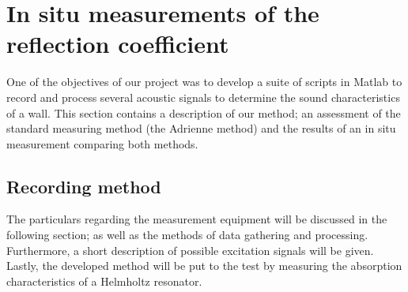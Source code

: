 \begin{comment}
\documentclass[12pt,a4paper]{article}
\usepackage{a4wide}
\usepackage{amsfonts, amsmath, amsthm}
\usepackage[english]{babel}
\usepackage{framed}
\usepackage[pdftex]{graphicx}
\usepackage{epstopdf}
\usepackage[font=small,format=plain,labelfont=bf,up,textfont=it,up]{caption}
\usepackage{wrapfig}
\usepackage{tocloft}
\usepackage{psfrag}
\usepackage{subfig}
\usepackage[latin1]{inputenc}
\usepackage{verbatim}

\usepackage{bbm}
\topmargin -15mm
\textwidth 16truecm
\textheight 24truecm
\setlength\parindent{0pt}
\setlength\parskip{0.20in plus0.05in minus0.05in}
\newcommand{\Z}{\mathbb{Z}}
\newcommand{\N}{\mathbb{N}}
\newcommand{\R}{\mathbb{R}}
\newcommand{\C}{\mathbb{C}}
\newcommand{\eps}{\varepsilon}
\fboxrule 1pt
\fboxsep 7pt
\pagenumbering{arabic}







\end{comment}


\section{In situ measurements of the reflection coefficient}
One of the objectives of our project was to develop a suite of scripts in Matlab to record and process several acoustic signals to determine the sound characteristics of a wall. 
This section contains a description of our method; an assessment of the standard measuring method (the Adrienne method) and the results of an in situ measurement comparing both methods. 

\subsection{Recording method}
The particulars regarding the measurement equipment will be discussed in the following section; as well as the methods of data gathering and processing. Furthermore, a short description of possible excitation signals will be given. Lastly, the developed method will be put to the test by measuring the absorption characteristics of a Helmholtz resonator.

